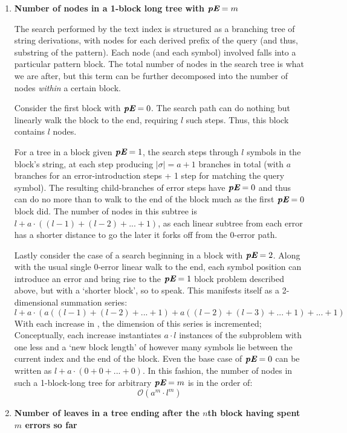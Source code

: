 \begin{enumerate}
\item \textbf{Number of nodes in a 1-block long tree with $\textit{\textbf{pE}}=m$}

The search performed by the \gls{text index} is structured as a branching tree of string \glspl{derivation}, with nodes for each derived prefix of the query (and thus, substring of the pattern). Each node (and each symbol) involved falls into a particular pattern \gls{block}. The total number of nodes in the search tree is what we are after, but this term can be further decomposed into the number of nodes \textit{within} a certain block.

Consider the first block with $\textit{\textbf{pE}}=0$. The search path can do nothing but linearly walk the block to the end, requiring $l$ such steps. Thus, this block contains $l$ nodes.

For a tree in a block given $\textit{\textbf{pE}}=1$, the search steps through $l$ symbols in the block's string, at each step producing $|\sigma{}|=a+1$ branches in total (with $a$ branches for an error-introduction steps + 1 step for matching the query symbol). The resulting child-branches of error steps have $\textit{\textbf{pE}}=0$ and thus can do no more than to walk to the end of the block much as the first $\textit{\textbf{pE}}=0$ block did. The number of nodes in this subtree is $l+a\cdot{}((l-1)+(l-2)+...+1)$, as each linear subtree from each error has a shorter distance to go the later it forks off from the 0-error path.

Lastly consider the case of a search beginning in a block with $\textit{\textbf{pE}}=2$.  Along with the usual single 0-error linear walk to the end, each symbol position can introduce an error and bring rise to the $\textit{\textbf{pE}}=1$ block problem described above, but with a `shorter block', so to speak. This manifests itself as a 2-dimensional summation series:
$$l + a\cdot{} (a((l-1)+(l-2)+...+1) + a((l-2)+(l-3)+...+1) +...+ 1 )$$
With each increase in , the dimension of this series is incremented; Conceptually, each increase instantiates $a\cdot{}l$ instances of the subproblem with one less  and a `new block length' of however many symbols lie between the current index and the end of the block. Even the base case of $\textit{\textbf{pE}}=0$ can be written as $l + a\cdot{}(0+0+...+0)$. In this fashion, the number of nodes in such a 1-block-long tree for arbitrary $\textit{\textbf{pE}}=m$ is in the order of: $$\mathcal{O}(a^m \cdot{} l^m)$$




\item \textbf{Number of leaves in a tree ending after the $n$th block having spent $m$ errors so far}


\end{enumerate}
